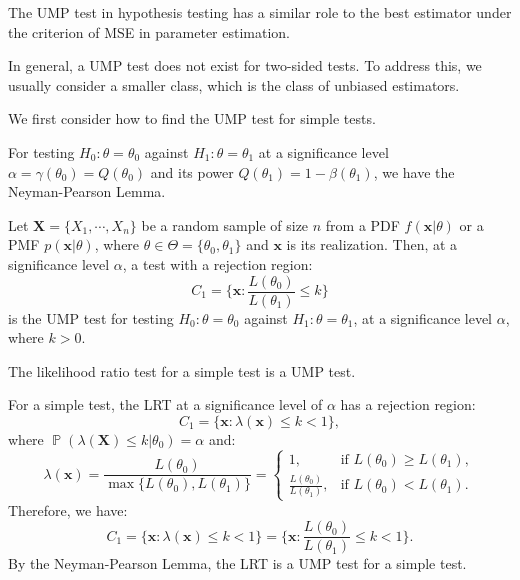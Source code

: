 \documentclass{huhtakm-template-book-v2}
\DeclareMathOperator{\prob}{\mathbb{P}}
\begin{document}
    \begin{rem}
        The UMP test in hypothesis testing has a similar role to the best estimator under the criterion of MSE in parameter estimation.
    \end{rem}
    \begin{rem}
        In general, a UMP test does not exist for two-sided tests. To address this, we usually consider a smaller class, which is the class of unbiased estimators.
    \end{rem}
    We first consider how to find the UMP test for simple tests.

    For testing $H_{0}:\theta=\theta_{0}$ against $H_{1}:\theta=\theta_{1}$ at a significance level $\alpha=\gamma(\theta_{0})=Q(\theta_{0})$ and its power $Q(\theta_{1})=1-\beta(\theta_{1})$, we have the Neyman-Pearson Lemma.
    \begin{lem}
        Let $\mathbf{X}=\{X_{1},\cdots,X_{n}\}$ be a random sample of size $n$ from a PDF $f(\mathbf{x}|\theta)$ or a PMF $p(\mathbf{x}|\theta)$, where $\theta\in\Theta=\{\theta_{0},\theta_{1}\}$ and $\mathbf{x}$ is its realization. Then, at a significance level $\alpha$, a test with a rejection region:
        \begin{equation*}
            C_{1}=\biggl\{\mathbf{x}:\frac{L(\theta_{0})}{L(\theta_{1})}\leq k\biggr\}
        \end{equation*}
        is the UMP test for testing $H_{0}:\theta=\theta_{0}$ against $H_{1}:\theta=\theta_{1}$, at a significance level $\alpha$, where $k>0$.
    \end{lem}
    \begin{thm}
        The likelihood ratio test for a simple test is a UMP test.
    \end{thm}
    \begin{proofing}
        For a simple test, the LRT at a significance level of $\alpha$ has a rejection region:
        \begin{equation*}
            C_{1}=\{\mathbf{x}:\lambda(\mathbf{x})\leq k<1\},
        \end{equation*}
        where $\prob(\lambda(\mathbf{X})\leq k|\theta_{0})=\alpha$ and:
        \begin{equation*}
            \lambda(\mathbf{x})=\frac{L(\theta_{0})}{\max\{L(\theta_{0}),L(\theta_{1})\}}=\begin{cases}
                1, &\text{if }L(\theta_{0})\geq L(\theta_{1}),\\
                \frac{L(\theta_{0})}{L(\theta_{1})}, &\text{if }L(\theta_{0})<L(\theta_{1}).
            \end{cases}
        \end{equation*}
        Therefore, we have:
        \begin{equation*}
            C_{1}=\{\mathbf{x}:\lambda(\mathbf{x})\leq k<1\}=\biggl\{\mathbf{x}:\frac{L(\theta_{0})}{L(\theta_{1})}\leq k<1\biggr\}.
        \end{equation*}
        By the Neyman-Pearson Lemma, the LRT is a UMP test for a simple test.
    \end{proofing}
\end{document}
